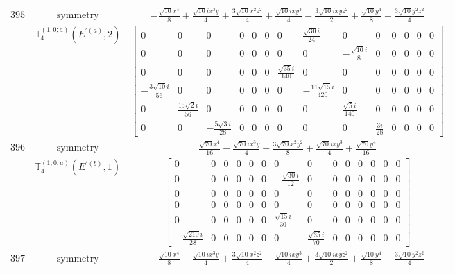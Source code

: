 \documentclass[fleqn,8pt,landscape]{jsarticle}
\begin{document}
\begin{longtable}{ccc}
$ 395 $ & $ \text{symmetry} $ & $ - \frac{\sqrt{10} x^{4}}{8} + \frac{\sqrt{10} i x^{3} y}{4} + \frac{3 \sqrt{10} x^{2} z^{2}}{4} + \frac{\sqrt{10} i x y^{3}}{4} - \frac{3 \sqrt{10} i x y z^{2}}{2} + \frac{\sqrt{10} y^{4}}{8} - \frac{3 \sqrt{10} y^{2} z^{2}}{4} $ \\
$  $ & $ \mathbb{T}_{4}^{(1,0;a)}(E^{\prime(a)},2) $ & $ \begin{bmatrix} 0 & 0 & 0 & 0 & 0 & 0 & 0 & \frac{\sqrt{30} i}{24} & 0 & 0 & 0 & 0 & 0 & 0 \\ 0 & 0 & 0 & 0 & 0 & 0 & 0 & 0 & - \frac{\sqrt{10} i}{8} & 0 & 0 & 0 & 0 & 0 \\ 0 & 0 & 0 & 0 & 0 & 0 & \frac{\sqrt{35} i}{140} & 0 & 0 & 0 & 0 & 0 & 0 & 0 \\ - \frac{3 \sqrt{10} i}{56} & 0 & 0 & 0 & 0 & 0 & 0 & - \frac{11 \sqrt{15} i}{420} & 0 & 0 & 0 & 0 & 0 & 0 \\ 0 & \frac{15 \sqrt{2} i}{56} & 0 & 0 & 0 & 0 & 0 & 0 & \frac{\sqrt{5} i}{140} & 0 & 0 & 0 & 0 & 0 \\ 0 & 0 & - \frac{5 \sqrt{3} i}{28} & 0 & 0 & 0 & 0 & 0 & 0 & \frac{3 i}{28} & 0 & 0 & 0 & 0 \end{bmatrix} $ \\ \hline
$ 396 $ & $ \text{symmetry} $ & $ \frac{\sqrt{70} x^{4}}{16} - \frac{\sqrt{70} i x^{3} y}{4} - \frac{3 \sqrt{70} x^{2} y^{2}}{8} + \frac{\sqrt{70} i x y^{3}}{4} + \frac{\sqrt{70} y^{4}}{16} $ \\
$  $ & $ \mathbb{T}_{4}^{(1,0;a)}(E^{\prime(b)},1) $ & $ \begin{bmatrix} 0 & 0 & 0 & 0 & 0 & 0 & 0 & 0 & 0 & 0 & 0 & 0 & 0 & 0 \\ 0 & 0 & 0 & 0 & 0 & 0 & - \frac{\sqrt{30} i}{12} & 0 & 0 & 0 & 0 & 0 & 0 & 0 \\ 0 & 0 & 0 & 0 & 0 & 0 & 0 & 0 & 0 & 0 & 0 & 0 & 0 & 0 \\ 0 & 0 & 0 & 0 & 0 & 0 & 0 & 0 & 0 & 0 & 0 & 0 & 0 & 0 \\ 0 & 0 & 0 & 0 & 0 & 0 & \frac{\sqrt{15} i}{30} & 0 & 0 & 0 & 0 & 0 & 0 & 0 \\ - \frac{\sqrt{210} i}{28} & 0 & 0 & 0 & 0 & 0 & 0 & \frac{\sqrt{35} i}{70} & 0 & 0 & 0 & 0 & 0 & 0 \end{bmatrix} $ \\ \hline
$ 397 $ & $ \text{symmetry} $ & $ - \frac{\sqrt{10} x^{4}}{8} - \frac{\sqrt{10} i x^{3} y}{4} + \frac{3 \sqrt{10} x^{2} z^{2}}{4} - \frac{\sqrt{10} i x y^{3}}{4} + \frac{3 \sqrt{10} i x y z^{2}}{2} + \frac{\sqrt{10} y^{4}}{8} - \frac{3 \sqrt{10} y^{2} z^{2}}{4} $ \\

\end{longtable}
\end{document}

